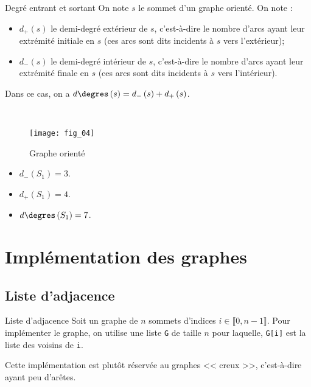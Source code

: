 \begin{defi}{Degré entrant et sortant}
On note $s$ le sommet d'un graphe orienté. On note : 
\begin{itemize}
\item $d_{+}\left(s\right)$ le demi-degré extérieur de $s$, c'est-à-dire le nombre d'arcs ayant leur extrémité initiale en $s$ (ces arcs sont dits incidents à $s$ vers l'extérieur);
\item $d_{-}\left(s\right)$ le demi-degré intérieur de $s$, c'est-à-dire le nombre d'arcs ayant leur extrémité finale en $s$ (ces arcs sont dits incidents à $s$ vers l'intérieur).
\end{itemize}

Dans ce cas, on a  $d\degres\left(s\right)=d_{-}\left(s\right)+d_{+}\left(s\right)$.
\end{defi}


\begin{exemple}~\\

\begin{multicols}{2}
\begin{figure}[H]
\centering
\texttt{[image: fig\_04]}
\captionsetup{justification=centering}
\caption{Graphe orienté \label{fig_04}}
\end{figure}

\begin{itemize}
\item $d_{-}\left(S_1\right)=3$.
\item $d_{+}\left(S_1\right)=4$.
\item $d\degres\left(S_1\right)=7$.
\end{itemize}
\end{multicols}

\end{exemple}

\section{Implémentation des graphes}

\subsection{Liste d'adjacence}
\begin{defi}{Liste d'adjacence}
Soit un graphe de $n$ sommets d'indices $i \in \llbracket 0, n-1\rrbracket$. Pour implémenter le graphe, on utilise une liste \texttt{G} de taille $n$ pour laquelle, \texttt{G[i]} est la liste des voisins de \texttt{i}.
\end{defi}
\begin{rem}
Cette implémentation est plutôt réservée au graphes << creux >>, c'est-à-dire ayant peu d'arêtes.
\end{rem}

